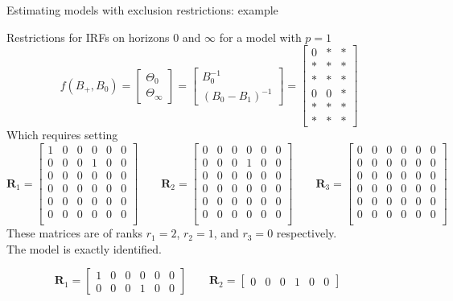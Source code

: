 \documentclass[notes,blackandwhite,mathsans,usenames,dvipsnames]{beamer}
\begin{document}
\begin{frame}{Estimating models with exclusion restrictions: example}

\bigskip\small
{\color{mcxs2}Restrictions for IRFs on horizons} $0$ {\color{mcxs2}and} $\infty$ {\color{mcxs2}for a model with} $p=1$\footnotesize
$$f(B_+,B_0) =\begin{bmatrix}\Theta_0\\ \Theta_{\infty}\end{bmatrix} = \begin{bmatrix}B_0^{-1}\\ (B_0-B_1)^{-1}\end{bmatrix}=
\begin{bmatrix} 0&*&*\\ *&*&*\\ *&*&*\\ 0&0&*\\ *&*&*\\ *&*&* \end{bmatrix}$$
\small {\color{mcxs2}Which requires setting} \tiny
$$  
\mathbf{R}_1 = \begin{bmatrix}1&0&0&0&0&0\\ 0&0&0&1&0&0\\ 0&0&0&0&0&0\\ 0&0&0&0&0&0\\ 0&0&0&0&0&0\\ 0&0&0&0&0&0\\\end{bmatrix}\qquad
\mathbf{R}_2 = \begin{bmatrix}0&0&0&0&0&0\\ 0&0&0&1&0&0\\ 0&0&0&0&0&0\\ 0&0&0&0&0&0\\ 0&0&0&0&0&0\\ 0&0&0&0&0&0\\\end{bmatrix}\qquad
\mathbf{R}_3 = \begin{bmatrix}0&0&0&0&0&0\\ 0&0&0&0&0&0\\ 0&0&0&0&0&0\\ 0&0&0&0&0&0\\ 0&0&0&0&0&0\\ 0&0&0&0&0&0\\\end{bmatrix}\qquad
$$
\small {\color{mcxs2}These matrices are of ranks} $r_1=2$, $r_2=1$, and $r_3=0$ {\color{mcxs2}respectively.}\\
{\color{mcxs2}The model is} {\color{purple}exactly identified.}

$$  
\mathbf{R}_1 = \begin{bmatrix}1&0&0&0&0&0\\ 0&0&0&1&0&0\end{bmatrix}\qquad
\mathbf{R}_2 = \begin{bmatrix}0&0&0&1&0&0\end{bmatrix}\qquad
$$

\end{frame}
\end{document}

